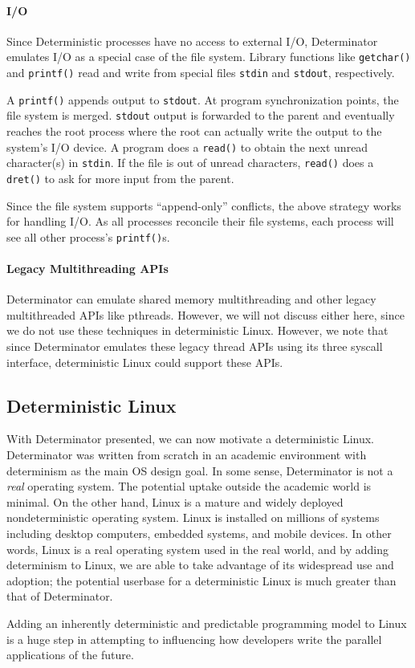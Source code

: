 \paragraph{I/O}
Since Deterministic processes have no access to external I/O, Determinator
emulates I/O as a special case of the file system. Library functions like
{\tt getchar()} and {\tt printf()} read and write from special files
{\tt stdin} and {\tt stdout}, respectively.

A {\tt printf()} appends output to {\tt stdout}. At program synchronization
points, the file system is merged. {\tt stdout} output is forwarded
to the parent and eventually reaches the root process where the root can
actually write the output to the system's I/O device.
A program does a {\tt read()} to obtain the next unread character(s) in
{\tt stdin}. If the file is out of unread characters, {\tt read()} does a
{\tt dret()} to ask for more input from the parent.

Since the file system supports ``append-only'' conflicts, the above strategy
works for handling I/O. As all processes reconcile their file systems, each
process will see all other process's {\tt printf()}s.

\paragraph{Legacy Multithreading APIs}
Determinator can emulate shared memory multithreading and other legacy
multithreaded APIs like pthreads. However, we will not discuss either here,
since we do not use these techniques in deterministic Linux. However, we note
that since Determinator emulates these legacy thread APIs using its three
syscall interface, deterministic Linux could support these APIs.

\subsection{Deterministic Linux}

With Determinator presented, we can now motivate a deterministic Linux.
Determinator was written from scratch in an academic environment with
determinism as the main OS design goal. In some sense, Determinator is not a
\emph{real} operating system. The potential uptake outside the academic
world is minimal. On the other hand, Linux is a mature and widely deployed
nondeterministic operating system. Linux is installed on millions of systems
including desktop computers, embedded systems, and mobile devices. In other
words, Linux is a real operating system used in the real world, and by adding
determinism to Linux, we are able to take advantage of its widespread
use and adoption; the potential userbase for a deterministic Linux is
much greater than that of Determinator.

Adding an inherently deterministic and predictable programming model to Linux is
a huge step in attempting to influencing how developers write the parallel
applications of the future.

\endinput

